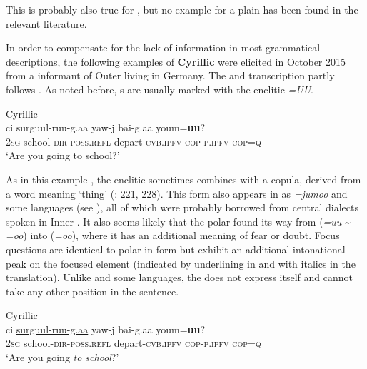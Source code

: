 \noindent This is probably also true for , but no example for a plain  has been found in the relevant literature.

In order to compensate for the lack of information in most grammatical descriptions, the following examples of \textbf{Cyrillic  } were elicited in October 2015 from a  informant of Outer  living in Germany. The  and transcription partly follows \citet{Janhunen2012c}. As noted before, s are usually marked with the enclitic \textit{=UU}.

\ea%
    \label{ex:mong:15}
    Cyrillic  \\
    \gll ci  surguul-ruu-g.aa  yaw-j      bai-g.aa  youm=\textbf{{uu}}?\\
    2\textsc{sg}  school-\textsc{dir}-\textsc{poss}.\textsc{refl}  depart-\textsc{cvb.ipfv}  \textsc{cop}-\textsc{p}.\textsc{ipfv}  \textsc{cop}=\textsc{q}\\
    \glt ‘Are you going to school?’
    \z

\noindent As in this example , the enclitic sometimes combines with a copula, derived from a word meaning ‘thing’ (\citealt{Janhunen2012c}: 221, 228). This form also appears in  as \textit{=jumo}\textit{o} and some  languages (see ), all of which were probably borrowed from central  dialects spoken in Inner . It also seems likely that the polar  found its way from  (\textit{=uu} {\textasciitilde} \textit{=oo}) into  (\textit{=oo}), where it has an additional meaning of fear or doubt. Focus questions are identical to polar  in form but exhibit an additional intonational peak on the focused element (indicated by underlining in  and with italics in the translation). Unlike  and some  languages, the  does not express  itself and cannot take any other position in the sentence.

\ea%
    \label{ex:mong:16}
    Cyrillic  \\
    \gll ci  \uline{surguul-ruu-g.aa} yaw-j      bai-g.aa  youm=\textbf{{uu}}?\\
    2\textsc{sg}  school-\textsc{dir}-\textsc{poss}.\textsc{refl}  depart-\textsc{cvb.ipfv}  \textsc{cop}-\textsc{p}.\textsc{ipfv}  \textsc{cop}=\textsc{q}\\
    \glt ‘Are you going \textit{to school}?’
    \z

